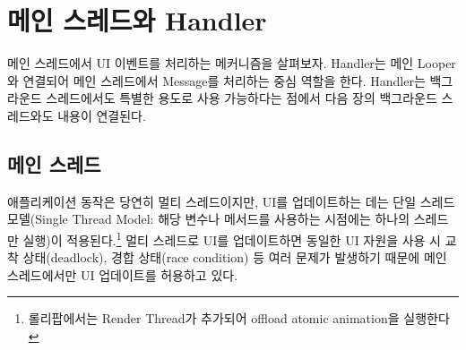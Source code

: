 \chapter{메인 스레드와 Handler}
메인 스레드에서 UI 이벤트를 처리하는 메커니즘을 살펴보자. Handler는 메인 Looper와 연결되어 메인 스레드에서 Message를 처리하는 중심 역할을 한다. Handler는 백그라운드 스레드에서도 특별한 용도로 사용 가능하다는 점에서 다음 장의 백그라운드 스레드와도 내용이 연결된다.

\section{메인 스레드}
애플리케이션 동작은 당연히 멀티 스레드이지만, UI를 업데이트하는 데는 단일 스레드 모델(Single Thread Model: 해당 변수나 메서드를 사용하는 시점에는 하나의 스레드만 실행)이 적용된다.\footnote{롤리팝에서는 Render Thread가 추가되어 offload atomic animation을 실행한다}
멀티 스레드로 UI를 업데이트하면 동일한 UI 자원을 사용 시 교착 상태(deadlock), 경합 상태(race condition) 등 여러 문제가 발생하기 때문에 메인 스레드에서만 UI 업데이트를 허용하고 있다.\\


